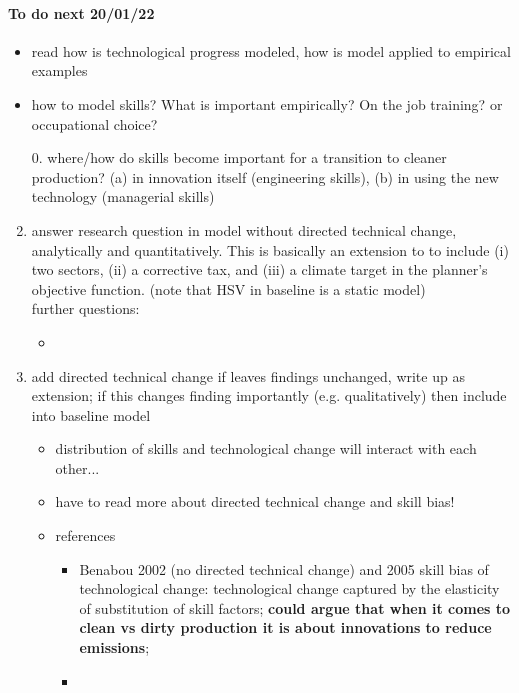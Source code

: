 \paragraph{To do next 20/01/22}
\begin{itemize}
	\item read \cite{Acemoglu2002DirectedChange} \ar how is technological progress modeled, how is model applied to empirical examples
	\item how to model skills? What is important empirically? On the job training? or occupational choice?
\end{itemize}
\begin{enumerate}
	\item[0.] where/how do skills become important for a transition to cleaner production? (a) in innovation itself (engineering skills), (b) in using the new technology (managerial skills) \citep{Vona2018EnvironmentalExploration}
\item answer research question in model without directed technical change, analytically and quantitatively. This is basically an extension to \cite{Heathcote2017OptimalFramework} to include (i) two sectors, (ii) a corrective tax, and (iii) a climate target in the planner's objective function. (note that HSV in baseline is a static model)
\\ further questions: 
\begin{itemize}
	\item {}
\end{itemize}
\item add directed technical change \ar if leaves findings unchanged, write up as extension; if this changes finding importantly (e.g. qualitatively) then include into baseline model
\begin{itemize}
	\item distribution of skills and technological change will interact with each other... 
	\item have to read more about directed technical change and skill bias!
	\item references
\begin{itemize}
	\item Benabou 2002 (\ar no directed technical change) and 2005 \ar skill bias of technological change: technological change captured by the elasticity of substitution of skill factors; \textbf{could argue that when it comes to clean vs dirty production it is about innovations to reduce emissions}; 
	\item \cite{Acemoglu2002DirectedChange}
\end{itemize}
\end{itemize}
\end{enumerate}